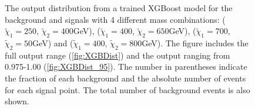 \begin{figure}
{    \hfill
    }
    \caption[The output distribution from a trained XGBoost model for the background and signals with 4 different mass combination.]{
    The output distribution from a trained XGBoost model for the background and signals with 4 different mass combinations:
    ($\tilde{\chi}_1=250$, $\tilde{\chi}_2=400$GeV), ($\tilde{\chi}_1=400$, $\tilde{\chi}_2=650$GeV), 
    ($\tilde{\chi}_1=700$, $\tilde{\chi}_2=50$GeV) and ($\tilde{\chi}_1=400$, $\tilde{\chi}_2=800$GeV). 
    The figure includes the full output range (\ref{fig:XGBDist}) and the output ranging from 0.975-1.00 (\ref{fig:XGBDist_95}).
    The number in parentheses indicate the fraction of each background and the absolute number of events for each signal point. 
    The total number of background events is also shown.}
    \label{fig:XGBDistComp}
\end{figure}
